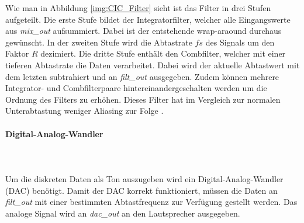 Wie man in Abbildung \ref{img:CIC_Filter} sieht ist das Filter in drei Stufen aufgeteilt. Die erste Stufe bildet der Integratorfilter, welcher alle Eingangswerte aus \textit{mix\_out} aufsummiert. Dabei ist der entstehende wrap-araound durchaus gewünscht. In der zweiten Stufe wird die Abtastrate \(fs\) des Signals um den Faktor \(R\) dezimiert. Die dritte Stufe enthält den Combfilter, welcher mit einer tieferen Abtastrate die Daten verarbeitet. Dabei wird der aktuelle Abtastwert mit dem letzten subtrahiert und an \textit{filt\_out} ausgegeben.
Zudem können mehrere Integrator- und Combfilterpaare hintereinandergeschalten werden um die Ordnung des Filters zu erhöhen. Dieses Filter hat im Vergleich zur normalen Unterabtastung weniger Aliasing zur Folge \cite{cic_a}.





\paragraph{Digital-Analog-Wandler}\mbox{}\\
\\Um die diskreten Daten als Ton auszugeben wird ein Digital-Analog-Wandler (DAC) benötigt. Damit der DAC korrekt funktioniert, müssen die Daten an \textit{filt\_out} mit einer bestimmten Abtastfrequenz zur Verfügung gestellt werden. Das analoge Signal wird an \textit{dac\_out} an den Lautsprecher ausgegeben.


